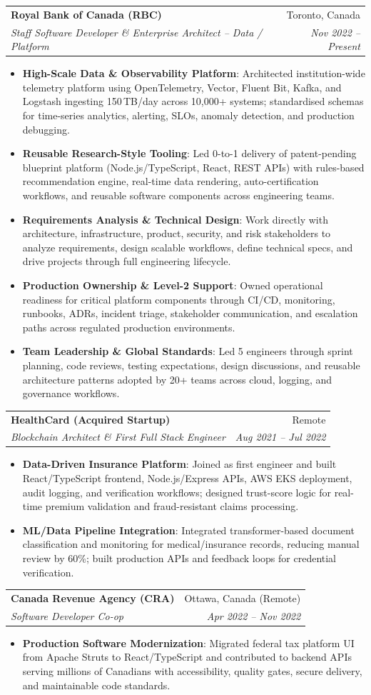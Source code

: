 \documentclass[letterpaper,9.5pt]{article}
\makeatletter
\newcommand{\resumeItem}[2]{\item\small{\textbf{#1}{: #2 \vspace{-2pt}}}}
\newcommand{\resumeSubheading}[4]{\vspace{-2pt}\item\begin{tabular*}{0.97\textwidth}{l@{\extracolsep{\fill}}r}\textbf{#1} & #2 \\\textit{\small#3} & \textit{\small #4} \\\end{tabular*}\vspace{-6pt}}
\newcommand{\resumeItemListStart}{\begin{itemize}}
\newcommand{\resumeItemListEnd}{\end{itemize}\vspace{-6pt}}
\makeatother
\begin{document}
  \resumeSubheading
    {Royal Bank of Canada (RBC)}{Toronto, Canada}
    {Staff Software Developer \& Enterprise Architect -- Data / Platform}{Nov 2022 -- Present}
  \resumeItemListStart
    \resumeItem{High-Scale Data \& Observability Platform}
      {Architected institution-wide telemetry platform using OpenTelemetry, Vector, Fluent Bit, Kafka, and Logstash ingesting 150\,TB/day across 10,000+ systems; standardised schemas for time-series analytics, alerting, SLOs, anomaly detection, and production debugging.}
    \resumeItem{Reusable Research-Style Tooling}
      {Led 0-to-1 delivery of patent-pending blueprint platform (Node.js/TypeScript, React, REST APIs) with rules-based recommendation engine, real-time data rendering, auto-certification workflows, and reusable software components across engineering teams.}
    \resumeItem{Requirements Analysis \& Technical Design}
      {Work directly with architecture, infrastructure, product, security, and risk stakeholders to analyze requirements, design scalable workflows, define technical specs, and drive projects through full engineering lifecycle.}
    \resumeItem{Production Ownership \& Level-2 Support}
      {Owned operational readiness for critical platform components through CI/CD, monitoring, runbooks, ADRs, incident triage, stakeholder communication, and escalation paths across regulated production environments.}
    \resumeItem{Team Leadership \& Global Standards}
      {Led 5 engineers through sprint planning, code reviews, testing expectations, design discussions, and reusable architecture patterns adopted by 20+ teams across cloud, logging, and governance workflows.}
  \resumeItemListEnd

  \resumeSubheading
    {HealthCard (Acquired Startup)}{Remote}
    {Blockchain Architect \& First Full Stack Engineer}{Aug 2021 -- Jul 2022}
  \resumeItemListStart
    \resumeItem{Data-Driven Insurance Platform}
      {Joined as first engineer and built React/TypeScript frontend, Node.js/Express APIs, AWS EKS deployment, audit logging, and verification workflows; designed trust-score logic for real-time premium validation and fraud-resistant claims processing.}
    \resumeItem{ML/Data Pipeline Integration}
      {Integrated transformer-based document classification and monitoring for medical/insurance records, reducing manual review by 60\%; built production APIs and feedback loops for credential verification.}
  \resumeItemListEnd

  \resumeSubheading
    {Canada Revenue Agency (CRA)}{Ottawa, Canada (Remote)}
    {Software Developer Co-op}{Apr 2022 -- Nov 2022}
  \resumeItemListStart
    \resumeItem{Production Software Modernization}
      {Migrated federal tax platform UI from Apache Struts to React/TypeScript and contributed to backend APIs serving millions of Canadians with accessibility, quality gates, secure delivery, and maintainable code standards.}
  \resumeItemListEnd
\end{document}
